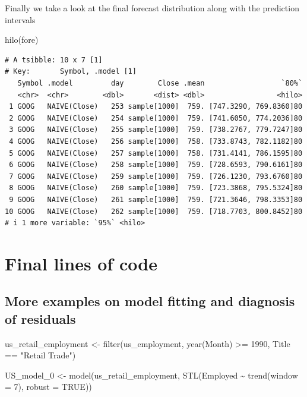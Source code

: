 \documentclass[
  letterpaper,
  DIV=11,
  numbers=noendperiod]{scrartcl}
\newenvironment{Shaded}{\begin{snugshade}}{\end{snugshade}}
\newcommand{\AttributeTok}[1]{\textcolor[rgb]{0.40,0.45,0.13}{#1}}
\newcommand{\ConstantTok}[1]{\textcolor[rgb]{0.56,0.35,0.01}{#1}}
\newcommand{\DecValTok}[1]{\textcolor[rgb]{0.68,0.00,0.00}{#1}}
\newcommand{\FunctionTok}[1]{\textcolor[rgb]{0.28,0.35,0.67}{#1}}
\newcommand{\NormalTok}[1]{\textcolor[rgb]{0.00,0.23,0.31}{#1}}
\newcommand{\OtherTok}[1]{\textcolor[rgb]{0.00,0.23,0.31}{#1}}
\newcommand{\SpecialCharTok}[1]{\textcolor[rgb]{0.37,0.37,0.37}{#1}}
\newcommand{\StringTok}[1]{\textcolor[rgb]{0.13,0.47,0.30}{#1}}
\newcommand*\circled[1]{\tikz[baseline=(char.base)]{
          \node[shape=circle,draw,inner sep=1pt] (char) {{\scriptsize#1}};}}
\begin{document}
Finally we take a look at the final forecast distribution along with the
prediction intervals

\begin{Shaded}
\begin{Highlighting}[]
\FunctionTok{hilo}\NormalTok{(fore)}
\end{Highlighting}
\end{Shaded}

\begin{verbatim}
# A tsibble: 10 x 7 [1]
# Key:       Symbol, .model [1]
   Symbol .model         day        Close .mean                  `80%`
   <chr>  <chr>        <dbl>       <dist> <dbl>                 <hilo>
 1 GOOG   NAIVE(Close)   253 sample[1000]  759. [747.3290, 769.8360]80
 2 GOOG   NAIVE(Close)   254 sample[1000]  759. [741.6050, 774.2036]80
 3 GOOG   NAIVE(Close)   255 sample[1000]  759. [738.2767, 779.7247]80
 4 GOOG   NAIVE(Close)   256 sample[1000]  758. [733.8743, 782.1182]80
 5 GOOG   NAIVE(Close)   257 sample[1000]  758. [731.4141, 786.1595]80
 6 GOOG   NAIVE(Close)   258 sample[1000]  759. [728.6593, 790.6161]80
 7 GOOG   NAIVE(Close)   259 sample[1000]  759. [726.1230, 793.6760]80
 8 GOOG   NAIVE(Close)   260 sample[1000]  759. [723.3868, 795.5324]80
 9 GOOG   NAIVE(Close)   261 sample[1000]  759. [721.3646, 798.3353]80
10 GOOG   NAIVE(Close)   262 sample[1000]  759. [718.7703, 800.8452]80
# i 1 more variable: `95%` <hilo>
\end{verbatim}

\section{Final lines of code}\label{final-lines-of-code}

\subsection{More examples on model fitting and diagnosis of
residuals}\label{more-examples-on-model-fitting-and-diagnosis-of-residuals}

\label{annotated-cell-40}%
\begin{Shaded}
\begin{Highlighting}[]
\NormalTok{us\_retail\_employment }\OtherTok{\textless{}{-}} \FunctionTok{filter}\NormalTok{(us\_employment, }\FunctionTok{year}\NormalTok{(Month) }\SpecialCharTok{\textgreater{}=} \DecValTok{1990}\NormalTok{,}
\NormalTok{                        Title }\SpecialCharTok{==} \StringTok{"Retail Trade"}\NormalTok{) }\hspace*{\fill}\NormalTok{\circled{1}}

\NormalTok{US\_model\_0 }\OtherTok{\textless{}{-}} \FunctionTok{model}\NormalTok{(us\_retail\_employment,}
              \FunctionTok{STL}\NormalTok{(Employed }\SpecialCharTok{\textasciitilde{}} \FunctionTok{trend}\NormalTok{(}\AttributeTok{window =} \DecValTok{7}\NormalTok{), }\AttributeTok{robust =} \ConstantTok{TRUE}\NormalTok{)) }\hspace*{\fill}\NormalTok{\circled{2}}
\end{Highlighting}
\end{Shaded}
\end{document}
